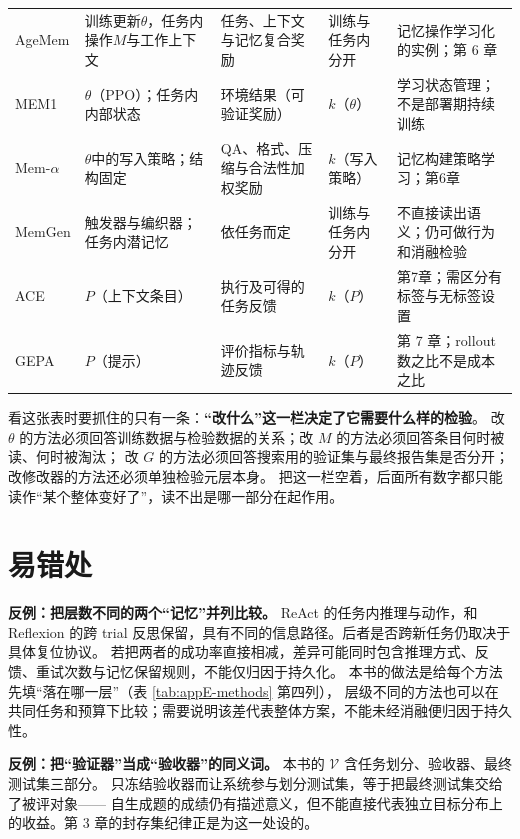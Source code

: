 \begin{longtable}{>{\raggedright\arraybackslash}p{2.9cm}>{\raggedright\arraybackslash}p{2.4cm}>{\raggedright\arraybackslash}p{1.9cm}>{\raggedright\arraybackslash}p{1.5cm}>{\raggedright\arraybackslash}p{3.9cm}}
AgeMem\cite{agemem-2601} & 训练更新$\theta$，任务内操作$M$与工作上下文 & 任务、上下文与记忆复合奖励 & 训练与任务内分开 & 记忆操作学习化的实例；第 6 章 \\
MEM1\cite{mem1-2506} & $\theta$（PPO）；任务内内部状态 & 环境结果（可验证奖励） & $k$（$\theta$） & 学习状态管理；不是部署期持续训练 \\
Mem-$\alpha$\cite{memalpha-2509} & $\theta$中的写入策略；结构固定 & QA、格式、压缩与合法性加权奖励 & $k$（写入策略） & 记忆构建策略学习；第6章 \\
MemGen\cite{memgen-2509} & 触发器与编织器；任务内潜记忆 & 依任务而定 & 训练与任务内分开 & 不直接读出语义；仍可做行为和消融检验 \\
ACE\cite{ace-2510} & $P$（上下文条目） & 执行及可得的任务反馈 & $k$（$P$） & 第7章；需区分有标签与无标签设置 \\
GEPA\cite{gepa-2507} & $P$（提示） & 评价指标与轨迹反馈 & $k$（$P$） & 第 7 章；rollout 数之比不是成本之比 \\
\end{longtable}
\endgroup

\begin{sloppypar}
看这张表时要抓住的只有一条：\textbf{“改什么”这一栏决定了它需要什么样的检验}。
改 $\theta$ 的方法必须回答训练数据与检验数据的关系；改 $M$ 的方法必须回答条目何时被读、何时被淘汰；
改 $G$ 的方法必须回答搜索用的验证集与最终报告集是否分开；改修改器的方法还必须单独检验元层本身。
把这一栏空着，后面所有数字都只能读作“某个整体变好了”，读不出是哪一部分在起作用。
\end{sloppypar}

\section{易错处}

\begin{pitfallbox}
\textbf{反例：把层数不同的两个“记忆”并列比较。}
ReAct 的任务内推理与动作，和 Reflexion 的跨 trial 反思保留，具有不同的信息路径。后者是否跨新任务仍取决于具体复位协议。
若把两者的成功率直接相减，差异可能同时包含推理方式、反馈、重试次数与记忆保留规则，不能仅归因于持久化。
本书的做法是给每个方法先填“落在哪一层”（表 \ref{tab:appE-methods} 第四列），
层级不同的方法也可以在共同任务和预算下比较；需要说明该差代表整体方案，不能未经消融便归因于持久性。
\end{pitfallbox}

\begin{pitfallbox}
\textbf{反例：把“验证器”当成“验收器”的同义词。}
本书的 $\mathcal V$ 含任务划分、验收器、最终测试集三部分。
只冻结验收器而让系统参与划分测试集，等于把最终测试集交给了被评对象——
自生成题的成绩仍有描述意义，但不能直接代表独立目标分布上的收益。第 3 章的封存集纪律正是为这一处设的。
\end{pitfallbox}

